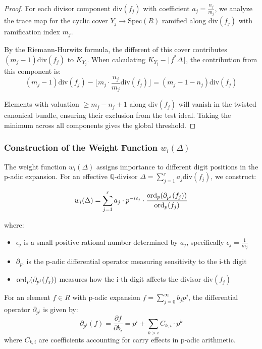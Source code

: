 \begin{proof}
For each divisor component $\text{div}(f_j)$ with coefficient $a_j = \frac{n_j}{m_j}$, we analyze the trace map for the cyclic cover $Y_j \to \text{Spec}(R)$ ramified along $\text{div}(f_j)$ with ramification index $m_j$.

By the Riemann-Hurwitz formula, the different of this cover contributes $(m_j-1)\text{div}(f_j)$ to $K_{Y_j}$. When calculating $K_{Y_j} - \lfloor f^*\Delta\rfloor$, the contribution from this component is:
$$(m_j-1)\text{div}(f_j) - \lfloor m_j \cdot \frac{n_j}{m_j} \text{div}(f_j) \rfloor = (m_j-1-n_j)\text{div}(f_j)$$

Elements with valuation $\geq m_j - n_j + 1$ along $\text{div}(f_j)$ will vanish in the twisted canonical bundle, ensuring their exclusion from the test ideal. Taking the minimum across all components gives the global threshold.
\end{proof}

\subsubsection{Construction of the Weight Function $w_i(\Delta)$}

The weight function $w_i(\Delta)$ assigns importance to different digit positions in the p-adic expansion. For an effective $\mathbb{Q}$-divisor $\Delta = \sum_{j=1}^{r} a_j \text{div}(f_j)$, we construct:

$$w_i(\Delta) = \sum_{j=1}^{r} a_j \cdot p^{-i\epsilon_j} \cdot \frac{\operatorname{ord}_p(\partial_{p^i}(f_j))}{\operatorname{ord}_p(f_j)}$$

where:
\begin{itemize}
    \item $\epsilon_j$ is a small positive rational number determined by $a_j$, specifically $\epsilon_j = \frac{1}{m_j}$
    \item $\partial_{p^i}$ is the p-adic differential operator measuring sensitivity to the i-th digit
    \item $\operatorname{ord}_p(\partial_{p^i}(f_j))$ measures how the i-th digit affects the divisor $\text{div}(f_j)$
\end{itemize}

\begin{proposition}\label{prop:differential-computation}
For an element $f \in R$ with p-adic expansion $f = \sum_{j=0}^{\infty} b_j p^j$, the differential operator $\partial_{p^i}$ is given by:
$$\partial_{p^i}(f) = \frac{\partial f}{\partial b_i} = p^i + \sum_{k > i} C_{k,i} \cdot p^k$$
where $C_{k,i}$ are coefficients accounting for carry effects in p-adic arithmetic.
\end{proposition}

